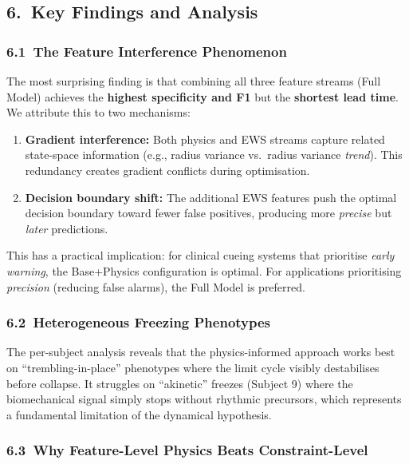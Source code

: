 \documentclass[12pt,a4paper]{article}
\begin{document}
\subsection*{6.\ Key Findings and Analysis}

\subsubsection*{6.1\ The Feature Interference Phenomenon}

The most surprising finding is that combining all three feature streams (Full Model) achieves the
\textbf{highest specificity and F1} but the \textbf{shortest lead time}. We attribute this to two
mechanisms:

\begin{enumerate}[leftmargin=*, itemsep=3pt]
  \item \textbf{Gradient interference:} Both physics and EWS streams capture related state-space
        information (e.g., radius variance vs.\ radius variance \emph{trend}). This redundancy
        creates gradient conflicts during optimisation.
  \item \textbf{Decision boundary shift:} The additional EWS features push the optimal decision
        boundary toward fewer false positives, producing more \emph{precise} but \emph{later}
        predictions.
\end{enumerate}

\noindent This has a practical implication: for clinical cueing systems that prioritise
\emph{early warning}, the Base+Physics configuration is optimal. For applications prioritising
\emph{precision} (reducing false alarms), the Full Model is preferred.

\subsubsection*{6.2\ Heterogeneous Freezing Phenotypes}

The per-subject analysis reveals that the physics-informed approach works best on
``trembling-in-place'' phenotypes where the limit cycle visibly destabilises before collapse.
It struggles on ``akinetic'' freezes (Subject 9) where the biomechanical signal simply stops
without rhythmic precursors, which represents a fundamental limitation of the dynamical hypothesis.

\subsubsection*{6.3\ Why Feature-Level Physics Beats Constraint-Level}
\end{document}

